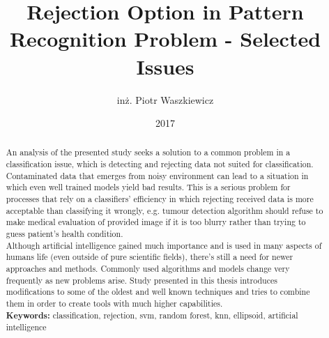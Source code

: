 \documentclass[en]{minipw} %
\title{Rejection Option in Pattern Recognition Problem - Selected Issues} %
\author{inż. Piotr Waszkiewicz}
\date{2017}
\begin{document}
\sloppy
	
	

	
	
	
	
\setcounter{page}{1}
	
{
	\begin{abstract}			
		
		An analysis of the presented study seeks a solution to a common problem in a classification issue, which is detecting and rejecting data not suited for classification. Contaminated data that emerges from noisy environment can lead to a situation in which even well trained models yield bad results. This is a serious problem for processes that rely on a classifiers' efficiency in which rejecting received data is more acceptable than classifying it wrongly, e.g. tumour detection algorithm should refuse to make medical evaluation of provided image if it is too blurry rather than trying to guess patient's health condition. \\
			
		Although artificial intelligence gained much importance and is used in many aspects of humans life (even outside of pure scientific fields), there's still a need for newer approaches and methods. Commonly used algorithms and models change very frequently as new problems arise. Study presented in this thesis introduces modifications to some of the oldest and well known techniques and tries to combine them in order to create tools with much higher capabilities. \\
		
		\noindent \textbf{Keywords:} classification, rejection, svm, random forest, knn, ellipsoid, artificial intelligence
\end{abstract}}
\end{document}
